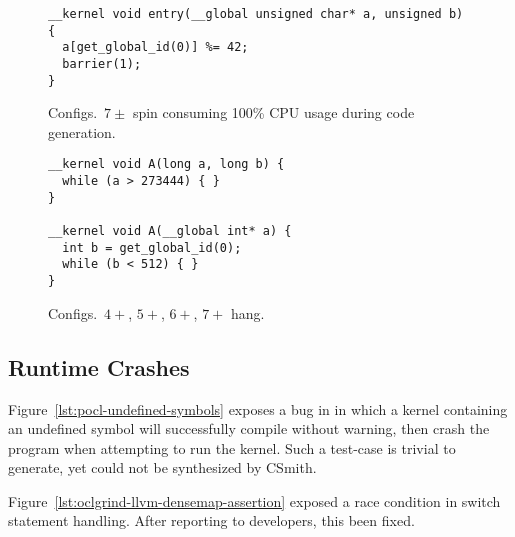 \begin{figure}
\begin{lstlisting}
__kernel void entry(__global unsigned char* a, unsigned b) {
  a[get_global_id(0)] %= 42;
  barrier(1);
}
\end{lstlisting}
\caption{Configs.\ $7\pm$ spin consuming 100\% CPU usage during code generation.}
\end{figure}

%

\begin{figure}
\begin{lstlisting}
__kernel void A(long a, long b) {
  while (a > 273444) { }
}

__kernel void A(__global int* a) {
  int b = get_global_id(0);
  while (b < 512) { }
}
\end{lstlisting}
\caption{Configs.\ $4+$, $5+$, $6+$, $7+$ hang.}
\end{figure}

\subsection{Runtime Crashes}

Figure~\ref{lst:pocl-undefined-symbols} exposes a bug in in which a kernel containing an undefined symbol will successfully compile without warning, then crash the program when attempting to run the kernel. Such a test-case is trivial to generate, yet could not be synthesized by CSmith.

Figure~\ref{lst:oclgrind-llvm-densemap-assertion} exposed a race condition in switch statement handling. After reporting to developers, this been fixed.

